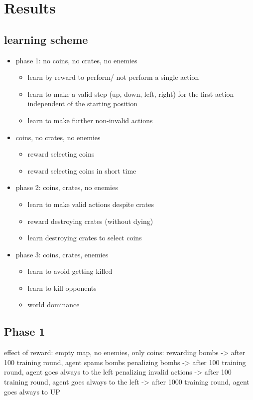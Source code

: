 \section{Results}

\subsection{learning scheme}

\begin{itemize}
	\item phase 1: no coins, no crates, no enemies
		\begin{itemize}
			\item learn by reward to perform/ not perform a single action 
			\item learn to make a valid step (up, down, left, right) for the first action independent of the starting position
			\item learn to make further non-invalid actions 
		\end{itemize}
	\item coins, no crates, no enemies
		\begin{itemize}
			\item reward selecting coins
			\item reward selecting coins in short time
		\end{itemize}
	\item phase 2: coins, crates, no enemies
		\begin{itemize}
			\item learn to make valid actions despite crates
			\item reward destroying crates (without dying)
			\item learn destroying crates to select coins
		\end{itemize}
	\item phase 3: coins, crates, enemies
		\begin{itemize}
			\item learn to avoid getting killed
			\item learn to kill opponents
			\item world dominance
		\end{itemize}
\end{itemize}



\subsection{Phase 1}

effect of reward:
empty map, no enemies, only coins:
rewarding bombs -> after 100 training round, agent spams bombs 
penalizing bombs -> after 100 training round, agent goes always to the left 
penalizing invalid actions -> after 100 training round, agent goes always to the left 
-> after 1000 training round, agent goes always to UP